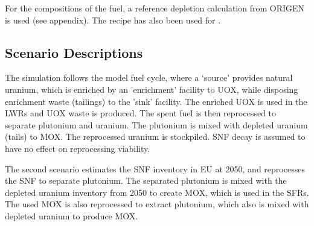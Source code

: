 For the compositions of the fuel, a reference depletion calculation
from ORIGEN is used (see appendix). The recipe has also been used for
\cite{wilson_adoption_2009}.

\subsection{Scenario Descriptions}
The simulation follows the model fuel cycle, where a `source'
provides natural uranium, which is enriched by an 'enrichment'
facility to \gls{UOX}, while disposing enrichment waste (tailings)
to the 'sink' facility. The enriched \gls{UOX} is used
in the \gls{LWR}s and \gls{UOX} waste is produced. The spent fuel
is then reprocessed to separate plutonium and uranium.
The plutonium is mixed with depleted uranium (tails) to \gls{MOX}.
The reprocessed uranium is stockpiled. \gls{SNF} decay is assumed
to have no effect on reprocessing viability.

The second scenario estimates the \gls{SNF} inventory in \gls{EU} at 2050,
and reprocesses the \gls{SNF} to separate plutonium. The separated
plutonium is mixed with the depleted uranium inventory from 2050
to create \gls{MOX}, which is used in the \gls{SFR}s. The used
\gls{MOX} is also reprocessed to extract plutonium, which also
is mixed with depleted uranium to produce \gls{MOX}.

